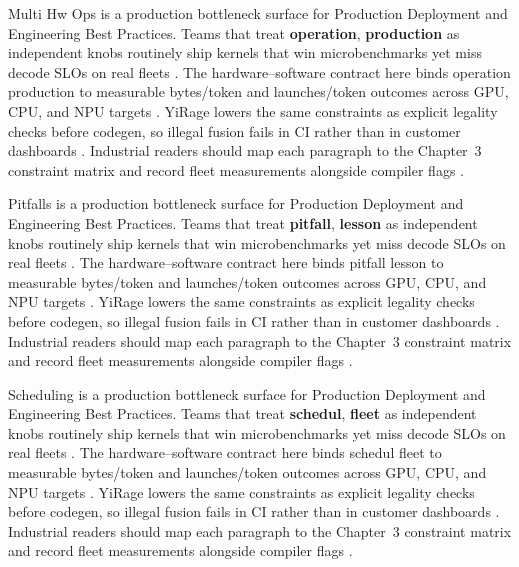 Multi Hw Ops is a production bottleneck surface for Production Deployment and Engineering Best Practices. Teams that treat \textbf{operation}, \textbf{production} as independent knobs routinely ship kernels that win microbenchmarks yet miss decode SLOs on real fleets \citep{amd2024xdna,dao2022flashattention}. The hardware--software contract here binds operation production to measurable bytes/token and launches/token outcomes across GPU, CPU, and NPU targets \citep{amd2024aie,kwon2023vllm}. YiRage lowers the same constraints as explicit legality checks before codegen, so illegal fusion fails in CI rather than in customer dashboards \citep{dlbook,nvidia2024cudagraphs}. Industrial readers should map each paragraph to the Chapter~3 constraint matrix and record fleet measurements alongside compiler flags \citep{dao2022flashattention,liu2024deepseekv3}.

Pitfalls is a production bottleneck surface for Production Deployment and Engineering Best Practices. Teams that treat \textbf{pitfall}, \textbf{lesson} as independent knobs routinely ship kernels that win microbenchmarks yet miss decode SLOs on real fleets \citep{amd2024aie,kwon2023vllm}. The hardware--software contract here binds pitfall lesson to measurable bytes/token and launches/token outcomes across GPU, CPU, and NPU targets \citep{dlbook,nvidia2024cudagraphs}. YiRage lowers the same constraints as explicit legality checks before codegen, so illegal fusion fails in CI rather than in customer dashboards \citep{dao2022flashattention,liu2024deepseekv3}. Industrial readers should map each paragraph to the Chapter~3 constraint matrix and record fleet measurements alongside compiler flags \citep{kwon2023vllm,patel2025llminference}.

Scheduling is a production bottleneck surface for Production Deployment and Engineering Best Practices. Teams that treat \textbf{schedul}, \textbf{fleet} as independent knobs routinely ship kernels that win microbenchmarks yet miss decode SLOs on real fleets \citep{dlbook,nvidia2024cudagraphs}. The hardware--software contract here binds schedul fleet to measurable bytes/token and launches/token outcomes across GPU, CPU, and NPU targets \citep{dao2022flashattention,liu2024deepseekv3}. YiRage lowers the same constraints as explicit legality checks before codegen, so illegal fusion fails in CI rather than in customer dashboards \citep{kwon2023vllm,patel2025llminference}. Industrial readers should map each paragraph to the Chapter~3 constraint matrix and record fleet measurements alongside compiler flags \citep{nvidia2024cudagraphs,taxbreak2026}.

